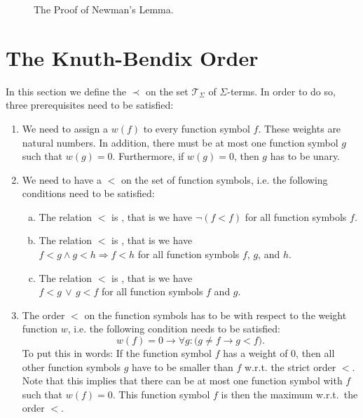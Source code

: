 \begin{figure}[!ht]
  \centering
  \caption{The Proof of Newman's Lemma.}
  \label{fig:newman.pdf}
\end{figure}

\section{The Knuth-Bendix Order}
In this section we define the  $\prec$ on the set $\mathcal{T}_\Sigma$ of
$\Sigma$-terms.  In order to do so, three prerequisites need to be satisfied:
\begin{enumerate}
\item We need to assign a  $w(f)$ to every function symbol $f$.  These weights are 
      natural numbers.  In addition, there must be at most one function symbol $g$ such that $w(g) = 0$.
      Furthermore, if $w(g) = 0$, then $g$ has to be unary.
\item We need to have a  $<$ on the set of function symbols, i.e. the following
      conditions need to be satisfied:
      \begin{enumerate}[(a)]
      \item The relation $<$ is , that is we have $\neg (f < f)$ for all function symbols $f$.
      \item The relation $<$ is , that is we have 
            \\[0.2cm]
            \hspace*{1.3cm}
            $f < g \wedge g < h \Rightarrow f < h$ \quad for all function symbols $f$, $g$, and $h$.
      \item The relation $<$ is , that is we have 
            \\[0.2cm]
            \hspace*{1.3cm}
            $f < g \,\vee\, g < f$ \quad for all function symbols $f$ and $g$.
      \end{enumerate}
\item The order $<$ on the function symbols has to be  with respect to the weight function
      $w$, i.e. the following condition needs to be satisfied:
   $$ w(f) = 0 \rightarrow \forall g:  \bigl(g \not=f \rightarrow g < f\bigr). $$
      To put this in words: If the function symbol $f$ has a weight of $0$, then 
      all other function symbols $g$ have to be smaller than $f$ w.r.t. the strict order $<$.
      Note that this implies that there can be at most one function symbol with $f$ such that $w(f) = 0$. 
      This function symbol $f$ is then the maximum w.r.t.~the order $<$.
\end{enumerate}
